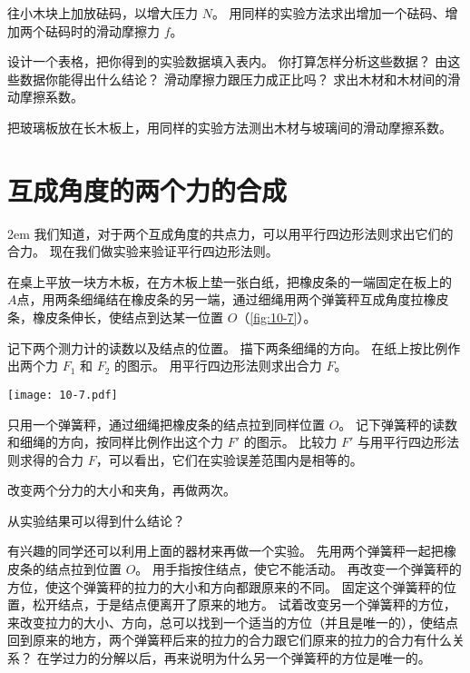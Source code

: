 往小木块上加放砝码，以增大压力 $N$。
用同样的实验方法求出增加一个砝码、增加两个砝码时的滑动摩擦力 $f$。

设计一个表格，把你得到的实验数据填入表内。
你打算怎样分析这些数据？
由这些数据你能得出什么结论？
滑动摩擦力跟压力成正比吗？
求出木材和木材间的滑动摩擦系数。

把玻璃板放在长木板上，用同样的实验方法测出木材与坡璃间的滑动摩擦系数。

\section{互成角度的两个力的合成}

\medskip\noindent
\begin{minipage}{0.58\linewidth}\parindent2em
我们知道，对于两个互成角度的共点力，可以用平行四边形法则求出它们的合力。
现在我们做实验来验证平行四边形法则。

在桌上平放一块方木板，在方木板上垫一张白纸，把橡皮条的一端固定在板上的 $A$点，用两条细绳结在橡皮条的另一端，通过细绳用两个弹簧秤互成角度拉橡皮条，橡皮条伸长，使结点到达某一位置 $O$（\cref{fig:10-7}）。

记下两个测力计的读数以及结点的位置。
描下两条细绳的方向。
在纸上按比例作出两个力 $F_1$ 和 $F_2$ 的图示。
用平行四边形法则求出合力 $F$。
\end{minipage}\hfill
\begin{minipage}{0.4\linewidth}\centering
\begin{figurehere}
  \texttt{[image: 10-7.pdf]}
  \caption{}\label{fig:10-7}
\end{figurehere}
\end{minipage}

\medskip
只用一个弹簧秤，通过细绳把橡皮条的结点拉到同样位置 $O$。
记下弹簧秤的读数和细绳的方向，按同样比例作出这个力 $F'$ 的图示。
比较力 $F'$ 与用平行四边形法则求得的合力 $F$，可以看出，它们在实验误差范围内是相等的。

改变两个分力的大小和夹角，再做两次。

从实验结果可以得到什么结论？

有兴趣的同学还可以利用上面的器材来再做一个实验。
先用两个弹簧秤一起把橡皮条的结点拉到位置 $O$。
用手指按住结点，使它不能活动。
再改变一个弹簧秤的方位，使这个弹簧秤的拉力的大小和方向都跟原来的不同。
固定这个弹簧秤的位置，松开结点，于是结点便离开了原来的地方。
试着改变另一个弹簧秤的方位，来改变拉力的大小、方向，总可以找到一个适当的方位（并且是唯一的），使结点回到原来的地方，两个弹簧秤后来的拉力的合力跟它们原来的拉力的合力有什么关系？
在学过力的分解以后，再来说明为什么另一个弹簧秤的方位是唯一的。	
	
